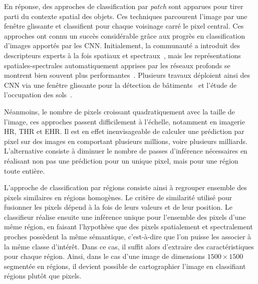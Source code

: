 En réponse, des approches de classification par \emph{patch} sont apparues pour tirer parti du contexte spatial des objets. Ces techniques parcourent l'image par une fenêtre glissante et classifient pour chaque voisinage carré le pixel central. Ces approches ont connu un succès considérable grâce aux progrès en classification d'images apportés par les \gls{CNN}. Initialement, la communauté a introduit des descripteurs experts à la fois spatiaux et spectraux~\cite{fauvel_advances_2013}, mais les représentations spatiales-spectrales automatiquement apprises par les réseaux profonds se montrent bien souvent plus performantes~\cite{nogueira_learning_2016,chen_deep_2016}. Plusieurs travaux déploient ainsi des \gls{CNN} via une fenêtre glissante pour la détection de bâtiments~\cite{vakalopoulou_building_2015} et l'étude de l'occupation des sols~\cite{papadomanolaki_patch-based_2017}.

% 

Néanmoins, le nombre de pixels croissant quadratiquement avec la taille de l'image, ces approches passent difficilement à l'échelle, notamment en imagerie \gls{HR}, \gls{THR} et \gls{EHR}. Il est en effet inenvisageable de calculer une prédiction par pixel sur des images en comportant plusieurs millions, voire plusieurs milliards. L'alternative consiste à diminuer le nombre de passes d'inférence nécessaires en réalisant non pas une prédiction pour un unique pixel, mais pour une région toute entière.

L'approche de classification par régions consiste ainsi à regrouper ensemble des pixels similaires en régions homogènes. Le critère de similarité utilisé pour fusionner les pixels dépend à la fois de leurs valeurs et de leur position. Le classifieur réalise ensuite une inférence unique pour l'ensemble des pixels d'une même région, en faisant l'hypothèse que des pixels spatialement et spectralement proches possèdent la même sémantique, c'est-à-dire que l'on puisse les associer à la même classe d'intérêt. Dans ce cas, il suffit alors d'extraire des caractéristiques pour chaque région. Ainsi, dans le cas d'une image de dimensions $1 500\times1 500$ segmentée en  régions, il devient possible de cartographier l'image en classifiant  régions plutôt que  pixels.

